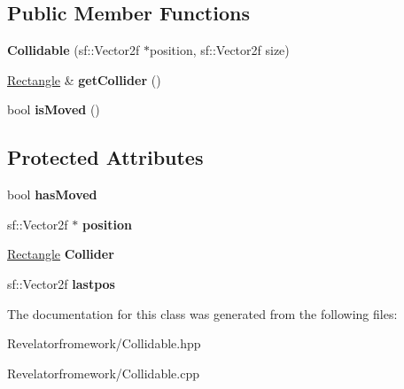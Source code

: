 \subsection*{Public Member Functions}
\begin{DoxyCompactItemize}
\item 
\hypertarget{class_collidable_a71a242ba63c157ca40acbf4421c0eaf7}{{\bfseries Collidable} (sf\-::\-Vector2f $\ast$position, sf\-::\-Vector2f size)}\label{class_collidable_a71a242ba63c157ca40acbf4421c0eaf7}

\item 
\hypertarget{class_collidable_ac9edfccd8c5a1ea77238c0a19aa910c3}{\hyperlink{class_rectangle}{Rectangle} \& {\bfseries get\-Collider} ()}\label{class_collidable_ac9edfccd8c5a1ea77238c0a19aa910c3}

\item 
\hypertarget{class_collidable_a8cc1f09ce02e6fcf56d98f07f908a104}{bool {\bfseries is\-Moved} ()}\label{class_collidable_a8cc1f09ce02e6fcf56d98f07f908a104}

\end{DoxyCompactItemize}
\subsection*{Protected Attributes}
\begin{DoxyCompactItemize}
\item 
\hypertarget{class_collidable_afe5442fd3a82abe62b95e93248d5f4a1}{bool {\bfseries has\-Moved}}\label{class_collidable_afe5442fd3a82abe62b95e93248d5f4a1}

\item 
\hypertarget{class_collidable_aa6c2e113d920df8c0d5da2a244f924bd}{sf\-::\-Vector2f $\ast$ {\bfseries position}}\label{class_collidable_aa6c2e113d920df8c0d5da2a244f924bd}

\item 
\hypertarget{class_collidable_a0a81575218d87940935d70800f7d663e}{\hyperlink{class_rectangle}{Rectangle} {\bfseries Collider}}\label{class_collidable_a0a81575218d87940935d70800f7d663e}

\item 
\hypertarget{class_collidable_ae50dbf8f9d1f584d3a5d5c3445fbe786}{sf\-::\-Vector2f {\bfseries lastpos}}\label{class_collidable_ae50dbf8f9d1f584d3a5d5c3445fbe786}

\end{DoxyCompactItemize}


The documentation for this class was generated from the following files\-:\begin{DoxyCompactItemize}
\item 
Revelatorfromework/Collidable.\-hpp\item 
Revelatorfromework/Collidable.\-cpp\end{DoxyCompactItemize}
